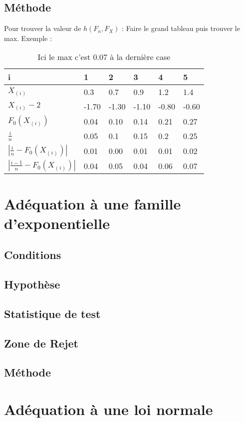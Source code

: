 \documentclass{article}
\theoremstyle{plain}%
\theoremstyle{definition}
\theoremstyle{remark}
\begin{document}
\subsection*{Méthode}
Pour trouver la valeur de $ h(F_n, F_X) $ : Faire le grand tableau puis trouver le max. Exemple : 
\begin{table}[!h]
    \centering
    \begin{tabular}{|l|l|l|l|l|l|}
    \hline
        i & 1 & 2 & 3 & 4 & 5 \\ \hline
        $X_{(i)}$ & 0.3 & 0.7 & 0.9 & 1.2 & 1.4 \\ \hline
        $X_{(i)} - 2$ & -1.70 & -1.30 & -1.10 & -0.80 & -0.60 \\ \hline
        $F_0(X_{(i)})$ & 0.04 & 0.10 & 0.14 & 0.21 & 0.27 \\ \hline
        $\frac{i}{n}$ & 0.05 & 0.1 & 0.15 & 0.2 & 0.25 \\ \hline
        $|\frac{i}{n} - F_0(X_{(i)})|$ & 0.01 & 0.00 & 0.01 & 0.01 & 0.02 \\ \hline
        $|\frac{i-1}{n} - F_0(X_{(i)})|$ & 0.04 & 0.05 & 0.04 & 0.06 & 0.07 \\ \hline
    \end{tabular}
    \caption{Ici le max c'est $0.07$ à la dernière case}
\end{table}


\section{Adéquation à une famille d'exponentielle}
\subsection*{Conditions}
\subsection*{Hypothèse}
\subsection*{Statistique de test}
\subsection*{Zone de Rejet}
\subsection*{Méthode}

\section{Adéquation à une loi normale}
\end{document}
